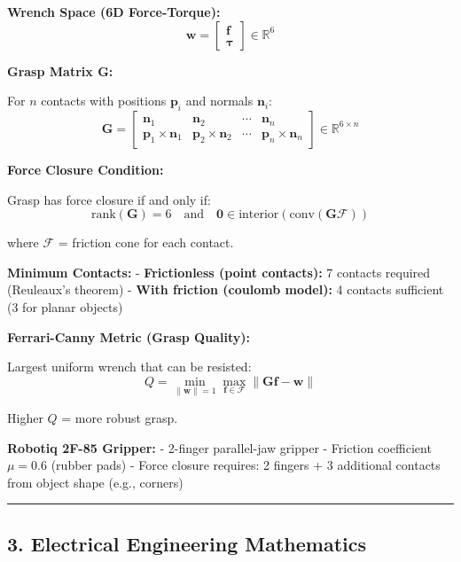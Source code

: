 \documentclass[
]{article}
\begin{document}
\textbf{Wrench Space (6D Force-Torque):} \[
\mathbf{w} =
\begin{bmatrix}
\mathbf{f} \\
\boldsymbol{\tau}
\end{bmatrix}
\in \mathbb{R}^6
\]

\textbf{Grasp Matrix \(\mathbf{G}\):}

For \(n\) contacts with positions \(\mathbf{p}_i\) and normals
\(\mathbf{n}_i\): \[
\mathbf{G} =
\begin{bmatrix}
\mathbf{n}_1 & \mathbf{n}_2 & \cdots & \mathbf{n}_n \\
\mathbf{p}_1 \times \mathbf{n}_1 & \mathbf{p}_2 \times \mathbf{n}_2 & \cdots & \mathbf{p}_n \times \mathbf{n}_n
\end{bmatrix}
\in \mathbb{R}^{6 \times n}
\]

\textbf{Force Closure Condition:}

Grasp has force closure if and only if: \[
\text{rank}(\mathbf{G}) = 6 \quad \text{and} \quad \mathbf{0} \in \text{interior}(\text{conv}(\mathbf{G} \mathcal{F}))
\]

where \(\mathcal{F}\) = friction cone for each contact.

\textbf{Minimum Contacts:} - \textbf{Frictionless (point contacts):} 7
contacts required (Reuleaux's theorem) - \textbf{With friction (coulomb
model):} 4 contacts sufficient (3 for planar objects)

\textbf{Ferrari-Canny Metric (Grasp Quality):}

Largest uniform wrench that can be resisted: \[
Q = \min_{\|\mathbf{w}\|=1} \max_{\mathbf{f} \in \mathcal{F}} \| \mathbf{G} \mathbf{f} - \mathbf{w} \|
\]

Higher \(Q\) = more robust grasp.

\textbf{Robotiq 2F-85 Gripper:} - 2-finger parallel-jaw gripper -
Friction coefficient \(\mu = 0.6\) (rubber pads) - Force closure
requires: 2 fingers + 3 additional contacts from object shape (e.g.,
corners)

\begin{center}\rule{0.5\linewidth}{0.5pt}\end{center}

\hypertarget{electrical-engineering-mathematics}{%
\subsection{3. Electrical Engineering
Mathematics}\label{electrical-engineering-mathematics}}
\end{document}
